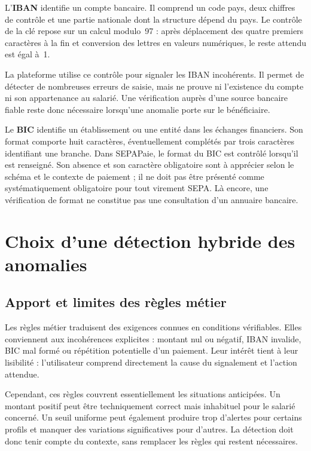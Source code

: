 L'\textbf{IBAN} identifie un compte bancaire. Il comprend un code pays, deux chiffres de contrôle et une partie nationale dont la structure dépend du pays. Le contrôle de la clé repose sur un calcul modulo~97 : après déplacement des quatre premiers caractères à la fin et conversion des lettres en valeurs numériques, le reste attendu est égal à~1.

La plateforme utilise ce contrôle pour signaler les IBAN incohérents. Il permet de détecter de nombreuses erreurs de saisie, mais ne prouve ni l'existence du compte ni son appartenance au salarié. Une vérification auprès d'une source bancaire fiable reste donc nécessaire lorsqu'une anomalie porte sur le bénéficiaire.

Le \textbf{BIC} identifie un établissement ou une entité dans les échanges financiers. Son format comporte huit caractères, éventuellement complétés par trois caractères identifiant une branche. Dans SEPAPaie, le format du BIC est contrôlé lorsqu'il est renseigné. Son absence et son caractère obligatoire sont à apprécier selon le schéma et le contexte de paiement ; il ne doit pas être présenté comme systématiquement obligatoire pour tout virement SEPA. Là encore, une vérification de format ne constitue pas une consultation d'un annuaire bancaire.

\section{Choix d'une détection hybride des anomalies}

\subsection{Apport et limites des règles métier}

Les règles métier traduisent des exigences connues en conditions vérifiables. Elles conviennent aux incohérences explicites : montant nul ou négatif, IBAN invalide, BIC mal formé ou répétition potentielle d'un paiement. Leur intérêt tient à leur lisibilité : l'utilisateur comprend directement la cause du signalement et l'action attendue.

Cependant, ces règles couvrent essentiellement les situations anticipées. Un montant positif peut être techniquement correct mais inhabituel pour le salarié concerné. Un seuil uniforme peut également produire trop d'alertes pour certains profils et manquer des variations significatives pour d'autres. La détection doit donc tenir compte du contexte, sans remplacer les règles qui restent nécessaires.

